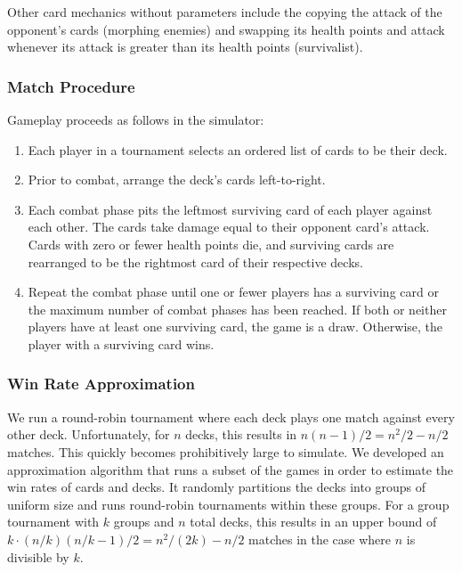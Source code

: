 Other card mechanics without parameters include the copying the 
attack of the opponent's cards (morphing enemies) and swapping 
its health points and attack whenever its attack is greater than its health 
points (survivalist).

\subsubsection{Match Procedure} \label{sec:game}

Gameplay proceeds as follows in the simulator:

\begin{enumerate}
	\item Each player in a tournament selects an ordered list
	of cards to be their deck.
	\item Prior to combat, arrange the deck's cards left-to-right.
	\item Each combat phase pits the leftmost surviving card
	of each player against each other. The cards take damage equal to %
        their opponent card's attack.
	Cards with zero or fewer health points die, and surviving cards
	are rearranged to be the rightmost card of their respective decks.
	\item Repeat the combat phase until one or fewer players has a surviving card
	or the maximum number of combat phases has been reached.
	If both or neither players have at least one surviving card, the game is a draw.
	Otherwise, the player with a surviving card wins.
\end{enumerate}

\subsubsection{Win Rate Approximation} \label{sec:tourney}

We run a round-robin tournament where each deck plays one match against every other deck.
Unfortunately, for $n$ decks, this results in $n(n-1)/2 = n^2/2 - n/2$ matches. This quickly becomes prohibitively large to simulate. We developed an approximation algorithm that runs a subset of the games in order to estimate the win rates of cards and decks. It
randomly partitions the decks into groups of uniform size and runs round-robin tournaments within these groups.
For a group tournament with $k$ groups and $n$ total decks, this results in an upper bound of $k \cdot (n/k)(n/k - 1)/2 = n^2/(2k) - n/2$ matches in the case where 
$n$ is divisible by $k$.

